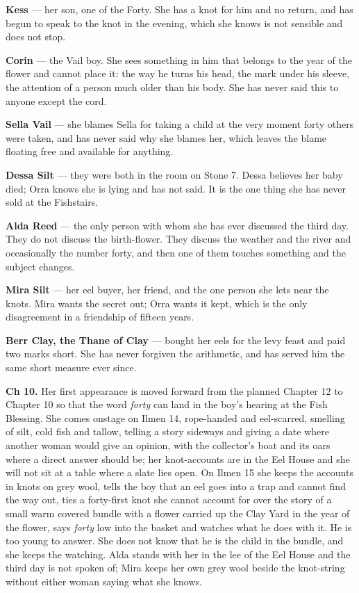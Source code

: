 \documentclass{design/chronicle}
\begin{document}
{
\textbf{Kess} — her son, one of the Forty. She has a knot for him and no return, and has begun to speak to the knot in the evening, which she knows is not sensible and does not stop.

\textbf{Corin} — the Vail boy. She sees something in him that belongs to the year of the flower and cannot place it: the way he turns his head, the mark under his sleeve, the attention of a person much older than his body. She has never said this to anyone except the cord.

\textbf{Sella Vail} — she blames Sella for taking a child at the very moment forty others were taken, and has never said why she blames her, which leaves the blame floating free and available for anything.

\textbf{Dessa Silt} — they were both in the room on Stone 7. Dessa believes her baby died; Orra knows she is lying and has not said. It is the one thing she has never sold at the Fishstairs.

\textbf{Alda Reed} — the only person with whom she has ever discussed the third day. They do not discuss the birth-flower. They discuss the weather and the river and occasionally the number forty, and then one of them touches something and the subject changes.

\textbf{Mira Silt} — her eel buyer, her friend, and the one person she lets near the knots. Mira wants the secret out; Orra wants it kept, which is the only disagreement in a friendship of fifteen years.

\textbf{Berr Clay, the Thane of Clay} — bought her eels for the levy feast and paid two marks short. She has never forgiven the arithmetic, and has served him the same short measure ever since.

\textbf{Ch 10.} Her first appearance is moved forward from the planned Chapter 12 to Chapter 10 so that the word \emph{forty} can land in the boy’s hearing at the Fish Blessing. She comes onstage on Ilmen 14, rope-handed and eel-scarred, smelling of silt, cold fish and tallow, telling a story sideways and giving a date where another woman would give an opinion, with the collector’s boat and its oars where a direct answer should be; her knot-accounts are in the Eel House and she will not sit at a table where a slate lies open. On Ilmen 15 she keeps the accounts in knots on grey wool, tells the boy that an eel goes into a trap and cannot find the way out, ties a forty-first knot she cannot account for over the story of a small warm covered bundle with a flower carried up the Clay Yard in the year of the flower, says \emph{forty} low into the basket and watches what he does with it. He is too young to answer. She does not know that he is the child in the bundle, and she keeps the watching. Alda stands with her in the lee of the Eel House and the third day is not spoken of; Mira keeps her own grey wool beside the knot-string without either woman saying what she knows.

}
\end{document}
